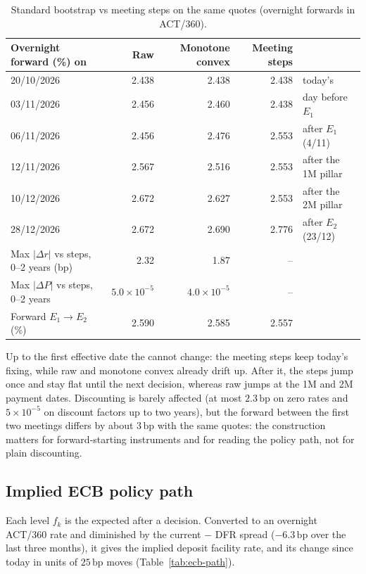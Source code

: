 \documentclass[11pt,a4paper]{article}
\theoremstyle{plain}
\theoremstyle{definition}
\newcommand{\bp}{\,\mathrm{bp}}
\newcommand{\estr}{\text{\texteuro STR}}
\begin{document}
\begin{table}[htbp]
\centering
\footnotesize
\begin{tabular}{@{}lrrrl@{}}
\toprule
Overnight forward (\%) on & Raw & Monotone convex & Meeting steps & \\
\midrule
20/10/2026 & 2.438 & 2.438 & 2.438 & today's \estr{} \\
03/11/2026 & 2.456 & 2.460 & 2.438 & day before $E_1$ \\
06/11/2026 & 2.456 & 2.476 & 2.553 & after $E_1$ (4/11) \\
12/11/2026 & 2.567 & 2.516 & 2.553 & after the 1M pillar \\
10/12/2026 & 2.672 & 2.627 & 2.553 & after the 2M pillar \\
28/12/2026 & 2.672 & 2.690 & 2.776 & after $E_2$ (23/12) \\
\midrule
Max $|\Delta r|$ vs steps, 0--2 years (bp) & 2.32 & 1.87 & -- & \\
Max $|\Delta P|$ vs steps, 0--2 years & $5.0\times10^{-5}$ & $4.0\times10^{-5}$ & -- & \\
Forward $E_1\to E_2$ (\%) & 2.590 & 2.585 & 2.557 & \\
\bottomrule
\end{tabular}
\caption{Standard bootstrap vs meeting steps on the same quotes (overnight forwards in ACT/360).}
\label{tab:compare}
\end{table}

Up to the first effective date the \estr{} cannot change: the meeting steps keep today's fixing, while raw and monotone convex already drift up. After it, the steps jump once and stay flat until the next decision, whereas raw jumps at the 1M and 2M payment dates. Discounting is barely affected (at most $2.3\bp$ on zero rates and $5\times10^{-5}$ on discount factors up to two years), but the forward between the first two meetings differs by about $3\bp$ with the same quotes: the construction matters for forward-starting instruments and for reading the policy path, not for plain discounting.

\subsection{Implied ECB policy path}
Each level $f_k$ is the \estr{} expected after a decision. Converted to an overnight ACT/360 rate and diminished by the current \estr{} $-$ DFR spread ($-6.3\bp$ over the last three months), it gives the implied deposit facility rate, and its change since today in units of $25\bp$ moves (Table~\ref{tab:ecb-path}).
\end{document}
